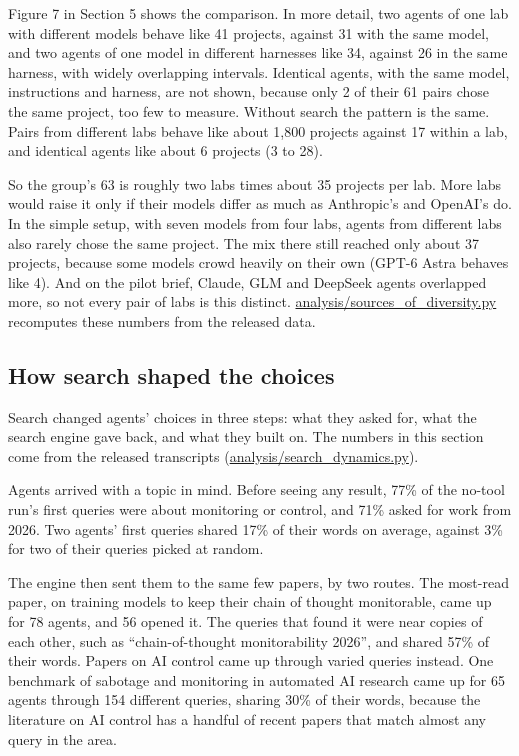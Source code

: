 \documentclass[11pt]{article}
\begin{document}
Figure 7 in Section 5 shows the comparison. In more detail, two agents
of one lab with different models behave like 41 projects, against 31
with the same model, and two agents of one model in different harnesses
like 34, against 26 in the same harness, with widely overlapping
intervals. Identical agents, with the same model, instructions and
harness, are not shown, because only 2 of their 61 pairs chose the same
project, too few to measure. Without search the pattern is the same.
Pairs from different labs behave like about 1,800 projects against 17
within a lab, and identical agents like about 6 projects (3 to 28).

So the group's 63 is roughly two labs times about 35 projects per lab.
More labs would raise it only if their models differ as much as
Anthropic's and OpenAI's do. In the simple setup, with seven models from
four labs, agents from different labs also rarely chose the same
project. The mix there still reached only about 37 projects, because
some models crowd heavily on their own (GPT-6 Astra behaves like 4). And
on the pilot brief, Claude, GLM and DeepSeek agents overlapped more, so
not every pair of labs is this distinct.
\href{https://github.com/AverroesLabs/ai-research-agent-diversity/blob/main/analysis/sources_of_diversity.py}{analysis/sources\_of\_diversity.py}
recomputes these numbers from the released data.

\subsection{How search shaped the
choices}\label{how-search-shaped-the-choices}

Search changed agents' choices in three steps: what they asked for, what
the search engine gave back, and what they built on. The numbers in this
section come from the released transcripts
(\href{https://github.com/AverroesLabs/ai-research-agent-diversity/blob/main/analysis/search_dynamics.py}{analysis/search\_dynamics.py}).

Agents arrived with a topic in mind. Before seeing any result, 77\% of
the no-tool run's first queries were about monitoring or control, and
71\% asked for work from 2026. Two agents' first queries shared 17\% of
their words on average, against 3\% for two of their queries picked at
random.

The engine then sent them to the same few papers, by two routes. The
most-read paper, on training models to keep their chain of thought
monitorable, came up for 78 agents, and 56 opened it. The queries that
found it were near copies of each other, such as ``chain-of-thought
monitorability 2026'', and shared 57\% of their words. Papers on AI
control came up through varied queries instead. One benchmark of
sabotage and monitoring in automated AI research came up for 65 agents
through 154 different queries, sharing 30\% of their words, because the
literature on AI control has a handful of recent papers that match
almost any query in the area.
\end{document}
